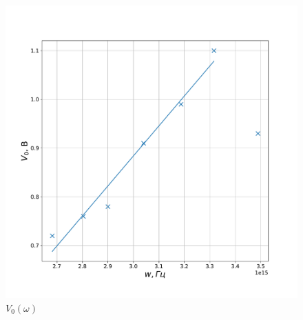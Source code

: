 \documentclass[a4paper, 12pt]{article}
\newcommand{\parag}[1]{\paragraph*{#1:}}
\newcounter{Points}
\newcommand{\point}{\arabic{Points}. \addtocounter{Points}{1}}
\begin{document}
\begin{figure}[!h]
    \centering
    \includegraphics[scale=0.35]{V0}
    \caption {$V_0 (\omega)$}
\end{figure}


\end{document}
